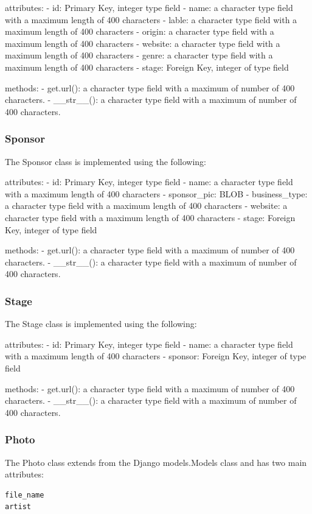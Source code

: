 \documentclass[12pt,english]{article}
\begin{document}
attributes:
- id: Primary Key, integer type field
- name: a character type field with a maximum length of 400 characters
- lable: a character type field with a maximum length of 400 characters
- origin: a character type field with a maximum length of 400 characters
- website: a character type field with a maximum length of 400 characters
- genre: a character type field with a maximum length of 400 characters
- stage: Foreign Key, integer of type field

methods:
- get.url(): a character type field with a maximum of number of 400 characters.
- __str__(): a character type field with a maximum of number of 400 characters.


\subsubsection{Sponsor}
The Sponsor class is implemented using the following:

attributes:
- id: Primary Key, integer type field
- name: a character type field with a maximum length of 400 characters
- sponsor_pic: BLOB
- business_type: a character type field with a maximum length of 400 characters
- website: a character type field with a maximum length of 400 characters
- stage: Foreign Key, integer of type field

methods:
- get.url(): a character type field with a maximum of number of 400 characters.
- __str__(): a character type field with a maximum of number of 400 characters.

\subsubsection{Stage}
The Stage class is implemented using the following:

attributes:
- id: Primary Key, integer type field
- name: a character type field with a maximum length of 400 characters
- sponsor: Foreign Key, integer of type field

methods:
- get.url(): a character type field with a maximum of number of 400 characters.
- __str__(): a character type field with a maximum of number of 400 characters.

\subsubsection{Photo}
The Photo class extends from the Django models.Models class and has two main attributes: 
\begin{verbatim}
file_name
artist
 \end{verbatim}
\end{document}
